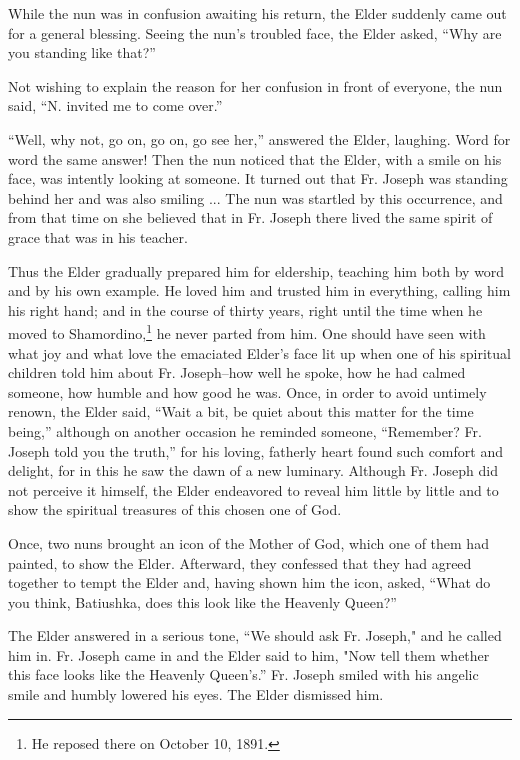 While the nun was in confusion awaiting his return, the Elder suddenly came out for a general blessing. Seeing the nun's troubled face, the Elder asked, “Why are you standing like that?”

Not wishing to explain the reason for her confusion in front of everyone, the nun said, “N. invited me to come over.”

“Well, why not, go on, go on, go see her,” answered the Elder, laughing. Word for word the same answer! Then the nun noticed that the Elder, with a smile on his face, was intently looking at someone. It turned out that Fr. Joseph was standing behind her and was also smiling ... The nun was startled by this occurrence, and from that time on she believed that in Fr. Joseph there lived the same spirit of grace that was in his teacher.

Thus the Elder gradually prepared him for eldership, teaching him both by word and by his own example. He loved him and trusted him in everything, calling him his right hand; and in the course of thirty years, right until the time when he moved to Shamordino,\footnote{He reposed there on October 10, 1891.} he never parted from him. One should have seen with what joy and what love the emaciated Elder's face lit up when one of his spiritual children told him about Fr. Joseph--how well he spoke, how he had calmed someone, how humble and how good he was. Once, in order to avoid untimely renown, the Elder said, “Wait a bit, be quiet about this matter for the time being,” although on another occasion he reminded someone, “Remember? Fr. Joseph told you the truth,” for his loving, fatherly heart found such comfort and delight, for in this he saw the dawn of a new luminary. Although Fr. Joseph did not perceive it himself, the Elder endeavored to reveal him little by little and to show the spiritual treasures of this chosen one of God.

Once, two nuns brought an icon of the Mother of God, which one of them had painted, to show the Elder. Afterward, they confessed that they had agreed together to tempt the Elder and, having shown him the icon, asked, “What do you think, Batiushka, does this look like the Heavenly Queen?”

The Elder answered in a serious tone, “We should ask Fr. Joseph," and he called him in. Fr. Joseph came in and the Elder said to him, "Now tell them whether this face looks like the Heavenly Queen’s.” Fr. Joseph smiled with his angelic smile and humbly lowered his eyes. The Elder dismissed him.

